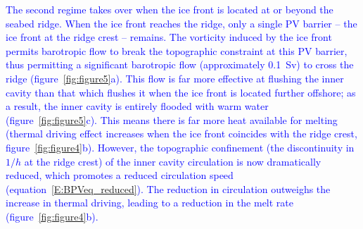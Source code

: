 \documentclass[draft]{agujournal2019}
\newcommand{\blue}[1]{\textcolor{blue}{#1}}
\begin{document}
\blue{The second regime takes over when the ice front is located at or beyond the seabed ridge. When the ice front  reaches the ridge, only a single PV barrier -- the ice front at the ridge crest -- remains. The vorticity induced by the ice front permits barotropic flow to break the topographic constraint at this PV barrier, thus permitting a significant barotropic flow (approximately 0.1~Sv) to cross the ridge (figure~\ref{fig:figure5}a). This flow is far more effective at flushing the inner cavity than that which flushes it when the ice front is located further offshore; as a result, the inner cavity is entirely flooded with warm water (figure~\ref{fig:figure5}c). This means there is far more heat available for melting (thermal driving effect increases when the ice front coincides with the ridge crest, figure~\ref{fig:figure4}b). However, the topographic confinement (the discontinuity in $1/h$ at the ridge crest) of the inner cavity circulation is now dramatically reduced, which promotes a reduced circulation speed (equation~\eqref{E:BPVeq_reduced}). The reduction in circulation outweighs the increase in thermal driving, leading to a reduction in the melt rate (figure~\ref{fig:figure4}b). }
\end{document}
